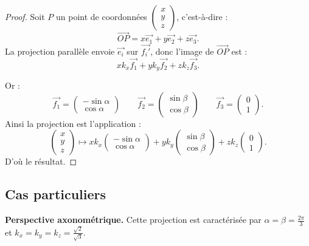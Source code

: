 \documentclass[11pt,class=report,crop=false]{standalone}
\begin{document}
\begin{proof}
Soit $P$ un point de coordonnées $\left(\begin{smallmatrix}x\\y\\z\end{smallmatrix}\right)$,
c'est-à-dire :
$$\overrightarrow{OP} = x\vec{e_1} + y\vec{e_2} + z \vec{e_3}.$$
La projection parallèle envoie $\vec{e_i}$ sur $\vec{f_i'}$, donc
l'image de $\overrightarrow{OP}$ est :
$$ x k_x \vec {f_1} + y k_y\vec {f_2} + z  k_z\vec {f_3}.$$

Or :
$$
\vec {f_1} = \begin{pmatrix}-\sin\alpha\\\cos\alpha\end{pmatrix}\qquad
\vec {f_2} = \begin{pmatrix}\sin\beta\\\cos\beta\end{pmatrix}\qquad
\vec {f_3} = \begin{pmatrix}0\\1\end{pmatrix}.
$$
Ainsi la projection est l'application :
$$\begin{pmatrix}x\\y\\z\end{pmatrix} \longmapsto 
x k_x\begin{pmatrix}-\sin\alpha\\\cos\alpha\end{pmatrix} 
+ y k_y\begin{pmatrix}\sin\beta\\\cos\beta\end{pmatrix}
+ z  k_z\begin{pmatrix}0\\1\end{pmatrix}.$$
D'où le résultat.
\end{proof}


\subsection{Cas particuliers}


\textbf{Perspective axonométrique.}
Cette projection est caractérisée par $\alpha=\beta=\frac{2\pi}{3}$ et $k_x=k_y=k_z=\frac{\sqrt2}{\sqrt3}$.

\end{document}
